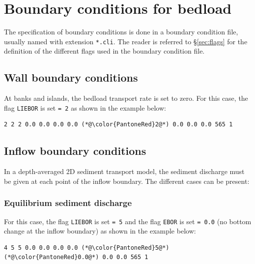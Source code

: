 \begin{itemize}
\end{itemize}

\section{Boundary conditions for bedload}
The specification of boundary conditions is done in a boundary condition file, usually named with extension \texttt{*.cli}. The reader is referred to \S\ref{sec:flags} for the definition of the different flags used in the boundary condition file.

\subsection{Wall boundary conditions}
At banks and islands, the bedload transport rate is set to zero. For this case, the flag \texttt{LIEBOR} is set \texttt{= 2} as shown in the example below:

\begin{lstlisting}[frame=trBL]
2 2 2 0.0 0.0 0.0 0.0 (*@\color{PantoneRed}2@*) 0.0 0.0 0.0 565 1
\end{lstlisting}

\subsection{Inflow boundary conditions}
In a depth-averaged 2D sediment transport model, the sediment discharge must be given at each point of the inflow boundary. The different cases can be present:
\subsubsection{Equilibrium sediment discharge}
For this case, the flag \texttt{LIEBOR} is set \texttt{= 5} and the flag \texttt{EBOR} is set \texttt{= 0.0} (no bottom change at the inflow boundary) as shown in the example below:

\begin{lstlisting}[frame=trBL]
4 5 5 0.0 0.0 0.0 0.0 (*@\color{PantoneRed}5@*) (*@\color{PantoneRed}0.0@*) 0.0 0.0 565 1
\end{lstlisting}

